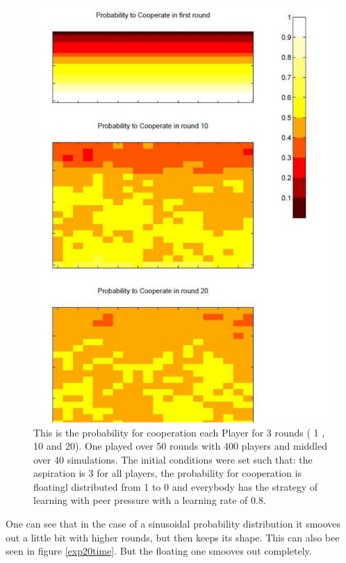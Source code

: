\documentclass[11pt]{article}
\begin{document}
\begin{figure}
\centering
\includegraphics[scale=0.4]{ProbabilityToCooperateInDiffRound20.pdf}
\caption[]{This is the probability for cooperation each Player for 3 rounds ( 1 , 10 and 20). One played over 50 rounds with 400 players and middled over 40 simulations. The initial conditions were set such that: the aspiration is 3 for all players, the probability for cooperation is floatingl distributed from 1 to 0 and everybody has the strategy of learning with peer pressure  with a learning rate of 0.8. }
\label{exp20}
\end{figure}

One can see that in the case of a sinusoidal probability distribution it smooves out a little bit with higher rounds, but then keeps its shape. This can also bee seen in figure \ref{exp20time}. But the floating one smooves out completely.
\end{document}
